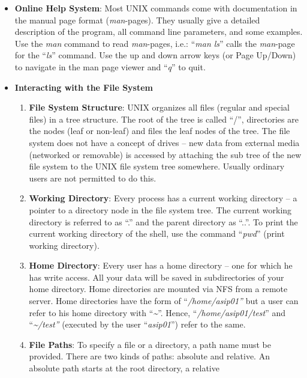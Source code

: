 \documentclass[
]{article}
\begin{document}
\begin{itemize}
\item
  \textbf{Online Help System}: Most UNIX commands come with
  documentation in the manual page format (\emph{man}-pages). They
  usually give a detailed description of the program, all command line
  parameters, and some examples. Use the \emph{man} command to read
  \emph{man}-pages, i.e.: ``\emph{man ls}'' calls the \emph{man}-page
  for the ``\emph{ls}'' command. Use the up and down arrow keys (or Page
  Up/Down) to navigate in the man page viewer and ``\emph{q}'' to quit.
\item
  \textbf{Interacting with the File System}

  \begin{enumerate}
  \def\labelenumi{\alph{enumi}.}
  \item
    \textbf{File System Structure}: UNIX organizes all files (regular
    and special files) in a tree structure. The root of the tree is
    called ``/'', directories are the nodes (leaf or non-leaf) and files
    the leaf nodes of the tree. The file system does not have a concept
    of drives -- new data from external media (networked or removable)
    is accessed by attaching the sub tree of the new file system to the
    UNIX file system tree somewhere. Usually ordinary users are not
    permitted to do this.
  \item
    \textbf{Working Directory}: Every process has a current working
    directory -- a pointer to a directory node in the file system tree.
    The current working directory is referred to as ``.'' and the parent
    directory as ``..''. To print the current working directory of the
    shell, use the command ``\emph{pwd}'' (print working directory).
  \item
    \textbf{Home Directory}: Every user has a home directory -- one for
    which he has write access. All your data will be saved in
    subdirectories of your home directory. Home directories are mounted
    via NFS from a remote server. Home directories have the form of
    ``\emph{/home/asip01''} but a user can refer to his home directory
    with ``\emph{\textasciitilde{}}''. Hence,
    ``\emph{/home/asip01/test}'' and ``\emph{\textasciitilde/test''}
    (executed by the user ``\emph{asip01}'') refer to the same.
  \item
    \textbf{File Paths}: To specify a file or a directory, a path name
    must be provided. There are two kinds of paths: absolute and
    relative. An absolute path starts at the root directory, a relative

\end{enumerate}
\end{itemize}
\end{document}
